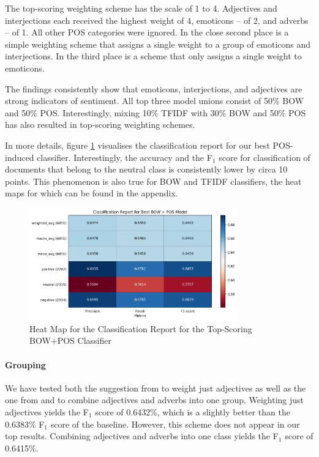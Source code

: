 \documentclass[titlepage]{article}
\begin{document}
The top-scoring weighting scheme has the scale of 1 to 4. Adjectives and interjections each received the highest weight of 4, emoticons -- of 2, and adverbs -- of 1. All other POS categories were ignored. In the close second place is a simple weighting scheme that assigns a single weight to a group of emoticons and interjections. In the third place is a scheme that only assigns a single weight to emoticons. 

The findings consistently show that emoticons, interjections, and adjectives are strong indicators of sentiment. All top three model unions consist of 50\% BOW and 50\% POS. Interestingly, mixing 10\% TFIDF with 30\% BOW and 50\% POS has also resulted in top-scoring weighting schemes.
     
In more details, figure \ref{bow_pos} visualises the classification report for our best POS-induced classifier. Interestingly, the accuracy and the F$_{1}$ score for classification of documents that belong to the neutral class is consistently lower by circa 10 points. This phenomenon is also true for BOW and TFIDF classifiers, the heat maps for which can be found in the appendix.

\begin{figure}[h]

\centering
\includegraphics[width=0.8\textwidth]{pics/BOW_POS.png}
\caption{Heat Map for the Classification Report for the Top-Scoring BOW+POS Classifier}
\label{bow_pos}
\end{figure}


   \paragraph{Grouping}
         We have tested both the suggestion from \cite{hatz} to weight just adjectives as well as the one from \cite{pos-based-model} and \cite{benamara}  to combine adjectives and adverbs into one group. Weighting just adjectives yields the F$_{1}$ score of 0.6432\%, which is a slightly better than the 0.6383\%  F$_{1}$ score of the baseline. However, this scheme does not appear in our top results. Combining adjectives and adverbs into one class yields the F$_{1}$ score of 0.6415\%. 
      
\end{document}

